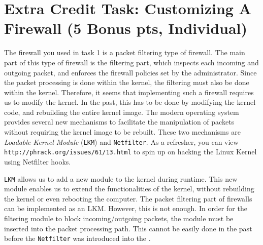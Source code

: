 


\section{Extra Credit Task: Customizing A Firewall (5 Bonus pts, Individual)} 

The firewall you used in task 1 is a packet filtering 
type of firewall. The main part of this type of firewall is the filtering part, 
which inspects each incoming and outgoing packet, and enforces the firewall policies 
set by the administrator. Since the packet 
processing is done within the kernel, the filtering must also be 
done within the kernel. Therefore, it seems that implementing such
a firewall requires us to modify the \linux kernel. In the past, 
this has to be done by modifying the kernel
code, and rebuilding the entire kernel image. The modern \linux 
operating system provides several new mechanisms 
to facilitate the manipulation of packets without requiring the 
kernel image to be rebuilt. These two mechanisms are 
{\em Loadable Kernel Module} ({\tt LKM}) and {\tt Netfilter}. As a refresher, you can view {\tt http://phrack.org/issues/61/13.html} to spin up on hacking the Linux Kernel using Netfilter hooks. 
 

{\tt LKM} allows us to add a new module to the kernel during runtime. 
This new module enables us to extend the functionalities of the kernel,
without rebuilding the kernel or even rebooting the computer. 
The packet filtering part of firewalls can be implemented 
as an LKM. However, this is not enough. In order for the filtering module to 
block incoming/outgoing packets, the module 
must be inserted into the packet processing path. 
This cannot be easily done in the past before 
the {\tt Netfilter} was introduced into the \linux.



